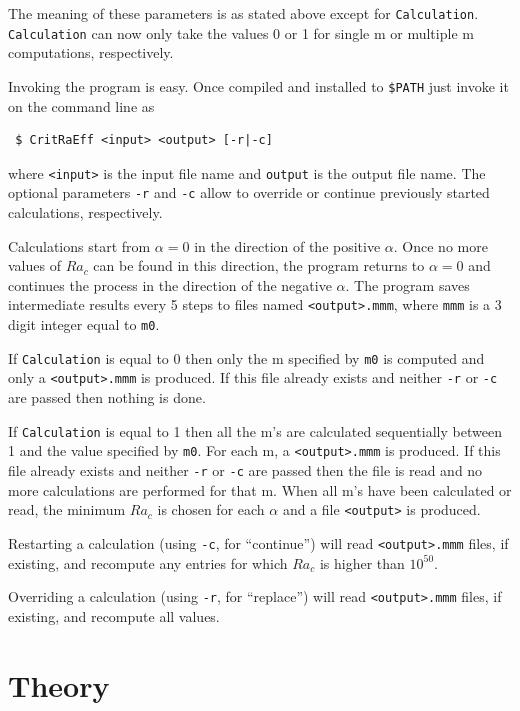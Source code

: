 \documentclass[a4paper,10pt]{book}
\begin{document}
The meaning of these parameters is as stated above except for \verb|Calculation|.
\verb|Calculation| can now only take the values 0 or 1 for single m or multiple 
m computations, respectively.

Invoking the program is easy. Once compiled and installed to \verb|$PATH| just
invoke it on the command line as
\begin{verbatim}
 $ CritRaEff <input> <output> [-r|-c]
\end{verbatim}
where \verb|<input>| is the input file name and \verb|output| is the output file
name. The optional parameters \verb|-r| and \verb|-c| allow to override or 
continue previously started calculations, respectively.

Calculations start from $\alpha=0$ in the direction of the positive $\alpha$. 
Once no more values of $Ra_c$ can be found in this direction, the program 
returns to $\alpha=0$ and continues the process in the direction of the 
negative $\alpha$. The program saves intermediate results every 5 steps to 
files named \verb|<output>.mmm|, where \verb|mmm| is a 3 digit integer equal to 
\verb|m0|. 

If \verb|Calculation| is equal to 0 then only the m specified by \verb|m0| is 
computed and only a \verb|<output>.mmm| is produced.  If this file already 
exists and neither \verb|-r| or \verb|-c| are passed then nothing is 
done. 

If \verb|Calculation| is equal to 1 then all the m's are calculated sequentially 
between 1 and the value specified by \verb|m0|. For each m, a 
\verb|<output>.mmm| is produced. If this file already exists and neither 
\verb|-r| or \verb|-c| are passed then the file is read and no more calculations 
are performed for that m. When all m's have been calculated or read, the minimum
$Ra_c$ is chosen for each $\alpha$ and a file \verb|<output>| is produced.

Restarting a calculation (using \verb|-c|, for ``continue'') will read 
\verb|<output>.mmm| files, if existing, and recompute any entries for which 
$Ra_c$ is higher than $10^{50}$.

Overriding a calculation (using \verb|-r|, for ``replace'')  will read 
\verb|<output>.mmm| files, if existing, and recompute all values.

\chapter{Theory}
\end{document}
